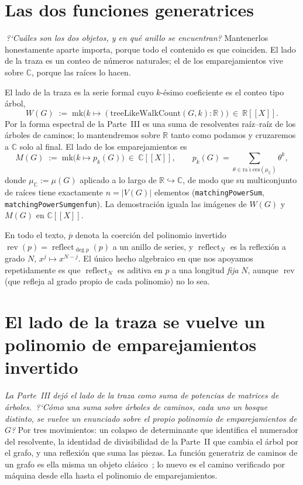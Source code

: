 \documentclass[11pt]{article}
\newcommand{\lean}[1]{{\def\_{\textunderscore\allowbreak}\texttt{#1}}}
\newcommand{\R}{\mathbb{R}}
\newcommand{\C}{\mathbb{C}}
\DeclareMathOperator{\reflect}{reflect}
\DeclareMathOperator{\rev}{rev}
\providecommand{\llbracket}{[\![}
\providecommand{\rrbracket}{]\!]}
\begin{document}
\section{Las dos funciones generatrices}
\label{sec:objects}

\emph{\,?`Cu\'ales son los dos objetos, y en qu\'e anillo se encuentran?} Mantenerlos honestamente
aparte importa, porque todo el contenido es que coinciden. El lado de la traza es un conteo de
n\'umeros naturales; el de los emparejamientos vive sobre $\C$, porque las ra\'ices lo hacen.

El lado de la traza es la serie formal cuyo $k$-\'esimo coeficiente es el conteo tipo \'arbol,
\[
  W(G)\;:=\;\mathrm{mk}\bigl(k\mapsto(\mathrm{treeLikeWalkCount}(G,k):\R)\bigr)\ \in\ \R\llbracket X\rrbracket .
\]
Por la forma espectral de la Parte~III es una suma de resolventes ra\'iz--ra\'iz de los \'arboles de
caminos; lo mantendremos sobre $\R$ tanto como podamos y cruzaremos a $\C$ solo al final. El lado de
los emparejamientos es
\[
  M(G)\;:=\;\mathrm{mk}\bigl(k\mapsto p_k(G)\bigr)\ \in\ \C\llbracket X\rrbracket,
  \qquad p_k(G)=\sum_{\theta\in\mathrm{ra\acute{\imath}ces}(\mu_\C)}\theta^{k},
\]
donde $\mu_\C:=\mu(G)$ aplicado a lo largo de $\R\hookrightarrow\C$, de modo que su multiconjunto de
ra\'ices tiene exactamente $n=|V(G)|$ elementos (\lean{matchingPowerSum}, \lean{matchingPowerSum\_genfun}).
La demostraci\'on iguala las im\'agenes de $W(G)$ y $M(G)$ en $\C\llbracket X\rrbracket$.

En todo el texto, $\overline{p}$ denota la coerci\'on del polinomio invertido $\rev(p)=\reflect_{\deg
p}(p)$ a un anillo de series, y $\reflect_N$ es la reflexi\'on a grado $N$, $x^j\mapsto x^{N-j}$. El
\'unico hecho algebraico en que nos apoyamos repetidamente es que $\reflect_N$ es aditiva en $p$ a una
longitud \emph{fija} $N$, aunque $\rev$ (que refleja al grado propio de cada polinomio) no lo sea.

\section{El lado de la traza se vuelve un polinomio de emparejamientos invertido}
\label{sec:trace}

\emph{La Parte~III dej\'o el lado de la traza como suma de potencias de matrices de \'arboles.
\,?`C\'omo una suma sobre \'arboles de caminos, cada uno un bosque distinto, se vuelve un enunciado
sobre el propio polinomio de emparejamientos de $G$?} Por tres movimientos: un colapso de determinante
que identifica el numerador del resolvente, la identidad de divisibilidad de la Parte~II que cambia el
\'arbol por el grafo, y una reflexi\'on que suma las piezas. La funci\'on generatriz de caminos de un
grafo es ella misma un objeto cl\'asico~\cite{GodsilMoments}; lo nuevo es el camino verificado por
m\'aquina desde ella hasta el polinomio de emparejamientos.
\end{document}
